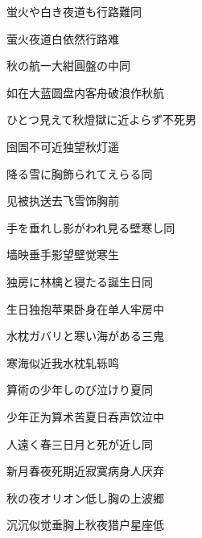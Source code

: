 \begin{haiku}
    {\FH 蛍火や白き夜道も行路難}\hfill{\FH 同}

    {\FK 萤火夜道白依然行路难}
\end{haiku}

\begin{haiku}
    {\FH 秋の航一大紺圓盤の中}\hfill{\FH 同}

    {\FK 如在大蓝圆盘内客舟破浪作秋航}
\end{haiku}

\begin{haiku}
    {\FH ひとつ見えて秋燈獄に近よらず}\hfill{\FH 不死男}

    {\FK 囹圄不可近独望秋灯遥}
\end{haiku}

\begin{haiku}
    {\FH 降る雪に胸飾られてえらる}\hfill{\FH 同}

    {\FK 见被执送去飞雪饰胸前}
\end{haiku}

\begin{haiku}
    {\FH 手を垂れし影がわれ見る壁寒し}\hfill{\FH 同}

    {\FK 墙映垂手影望壁觉寒生}
\end{haiku}

\begin{haiku}
    {\FH 独房に林檎と寝たる誕生日}\hfill{\FH 同}

    {\FK 生日独抱苹果卧身在单人牢房中}
\end{haiku}

\begin{haiku}
    {\FH 水枕ガバリと寒い海がある}\hfill{\FH 三鬼}

    {\FK 寒海似近我水枕轧轹鸣}
\end{haiku}

\begin{haiku}
    {\FH 算術の少年しのび泣けり夏}\hfill{\FH 同}

    {\FK 少年正为算术苦夏日呑声饮泣中}
\end{haiku}

\begin{haiku}
    {\FH 人遠く春三日月と死が近し}\hfill{\FH 同}

    {\FK 新月春夜死期近寂寞病身人厌弃}
\end{haiku}

\begin{haiku}
    {\FH 秋の夜オリオン低し胸の上}\hfill{\FH 波郷}

    {\FK 沉沉似觉垂胸上秋夜猎户星座低}
\end{haiku}

